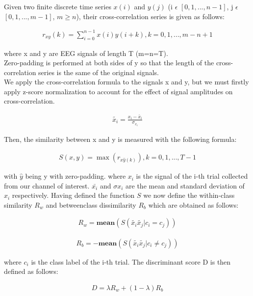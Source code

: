 \documentclass{Configuration_Files/PoliMi3i_thesis}
\begin{document}
Given two finite discrete time series $x(i)$ and $y(j)$
(i $\epsilon$ $[0, 1, . . . , n - 1]$, j $\epsilon$ $[0, 1, . . . , m - 1]$, $m \geq n$),
their cross-correlation series is given as follows:

\begin{align}
	 r_{xy}(k) = \sum_{i=0}^{n-1}x(i)y(i + k), k = 0,1,...,m-n+1
	\label{eq:XCDC1}
\end{align}

where x and y are EEG signals of length T (m=n=T). \\ 
Zero-padding is performed at both sides of y so that the length of the cross-correlation series is the same of the original signals. \\
We apply the cross-correlation formula to the signals x and y, but we must firstly apply z-score normalization to account for the effect of signal amplitudes on cross-correlation.

\begin{align}
	\tilde{x_i} = \frac{x_i - \bar x_i}{\sigma_{x_i}}
   \label{eq:XCDC3}
\end{align}


Then, the similarity between x and y is measured with the following formula:

\begin{align}
	S(x,y) = \max(r_{x\hat{y}(k)}), k=0,1,..., T - 1 
   \label{eq:XCDC2}
\end{align}

with $\hat{y}$ being y with zero-padding.
where $x_i$ is the signal of the i-th trial collected from our channel of interest. $\bar{x_i}$ and $\sigma{x_i}$ are
the mean and standard deviation of $x_i$ respectively.
Having defined the function $S$ we now define the within-class similarity $R_w$ and betweenclass dissimilarity $R_b$ which are obtained as follows:

\begin{align}
	R_w = \mathbf{mean}(S(\tilde{x_i}\tilde{x_j}| c_i = c_j))
   \label{eq:XCDC4}
\end{align}

\begin{align}
	R_b = -\mathbf{mean}(S(\tilde{x_i}\tilde{x_j}| c_i \neq  c_j))
   \label{eq:XCDC5}
\end{align}

where $c_i$ is the class label of the i-th trial. The discriminant score D is then defined as follows:

\begin{align}
	D = \lambda R_w + (1-\lambda)R_b
   \label{eq:XCDC6}
\end{align}
\end{document}
